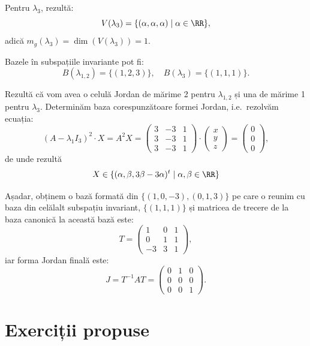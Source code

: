 Pentru $ \lambda_3 $, rezultă:
\[
    V(\lambda_3) = \{ (\alpha, \alpha, \alpha) \mid \alpha \in \RR \},
\]
adică $ m_g(\lambda_3) = \dim(V(\lambda_3)) = 1 $.

Bazele în subspațiile invariante pot fi:
\[
    B(\lambda_{1,2}) = \{(1, 2, 3)\}, \quad B(\lambda_3) = \{ (1, 1, 1) \}.
\]

Rezultă că vom avea o celulă Jordan de mărime 2 pentru $ \lambda_{1,2} $ și una
de mărime 1 pentru $ \lambda_3 $. Determinăm baza corespunzătoare formei
Jordan, i.e.\ rezolvăm ecuația:
\[
    (A - \lambda_1I_3)^2 \cdot X = A^2 X = %
    \begin{pmatrix}
        3 & -3 & 1 \\
        3 & -3 & 1 \\
        3 & -3 & 1
    \end{pmatrix} \cdot %
    \begin{pmatrix}
        x \\ y \\ z
    \end{pmatrix} = %
    \begin{pmatrix} 0 \\ 0 \\ 0 \end{pmatrix},
\]
de unde rezultă 
\[
    X \in \{ (\alpha, \beta, 3\beta - 3 \alpha)^t \mid \alpha, \beta \in \RR \}
\]

Așadar, obținem o bază formată din $ \{ (1, 0, -3), (0, 1, 3) \} $
pe care o reunim cu baza din celălalt subspațiu invariant,
$ \{ (1, 1, 1) \} $ și matricea de trecere de la baza canonică la această
bază este:
\[
    T = \begin{pmatrix}
        1 & 0 & 1 \\
        0 & 1 & 1 \\
        -3 & 3 & 1
    \end{pmatrix},
\]
iar forma Jordan finală este:
\[
    J = T^{-1} A T = %
    \begin{pmatrix}
        0 & 1 & 0 \\
        0 & 0 & 0 \\
        0 & 0 & 1
    \end{pmatrix}.
\]




\section{Exerciții propuse}


